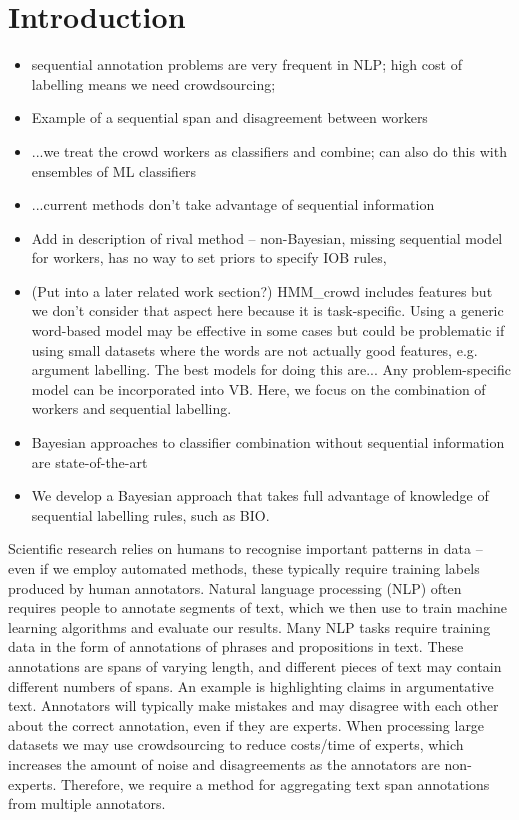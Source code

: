 \section{Introduction}\label{sec:intro}

\begin{itemize}
\item sequential annotation problems are very frequent in NLP; high cost of labelling means we need crowdsourcing; 
\item Example of a sequential span and disagreement between workers
\item ...we treat the crowd workers as classifiers and combine; can also do this with ensembles of ML classifiers
\item ...current methods don’t take advantage of sequential information
\item Add in description of rival method – non-Bayesian, missing sequential model for workers, has no way to set priors to specify IOB rules, 
\item (Put into a later related work section?) HMM\_crowd includes features but we don't consider that aspect here because it is task-specific. 
Using a generic word-based model may be effective in some cases but could be problematic if using small datasets where the words are not actually good features, e.g. argument labelling. 
The best models for doing this are... Any problem-specific model can be incorporated into VB. Here, we focus on the combination of workers and sequential labelling.
\item Bayesian approaches to classifier combination without sequential information are state-of-the-art
\item We develop a Bayesian approach that takes full advantage of knowledge of sequential labelling rules, such as BIO.
\end{itemize}

Scientific research relies on humans to recognise important patterns in data – even if we employ automated methods, these typically require training labels produced by human annotators. 
Natural language processing (NLP) often requires people to annotate segments of text, which we then use to train machine learning algorithms and evaluate our results.
Many NLP tasks require training data in the form of annotations of phrases and propositions in text. These annotations are spans of varying length, and different pieces of text may contain different numbers of spans. An example is highlighting claims in argumentative text. Annotators will typically make mistakes and may disagree with each other about the correct annotation, even if they are experts. When processing large datasets we may use crowdsourcing to reduce costs/time of experts, which increases the amount of noise and disagreements as the annotators are non-experts. Therefore, we require a method for aggregating text span annotations from multiple annotators.

